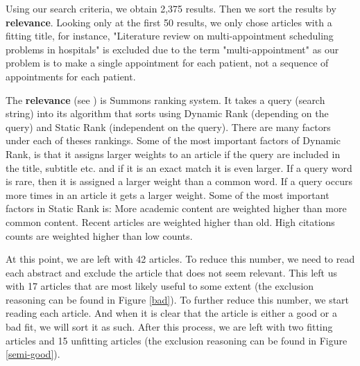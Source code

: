 \documentclass[a4paper,12pt]{article}
\begin{document}
\bigbreak

Using our search criteria, we obtain 2,375 results. Then we sort the results by \textbf{relevance}.
Looking only at the first 50 results, we only chose articles with a fitting title, for instance, "Literature review on multi-appointment scheduling problems in hospitals" is excluded due to the term "multi-appointment" as our problem is to make a single appointment for each patient, not a sequence of appointments for each patient.
\bigbreak

The \textbf{relevance} (see \cite{relevance}) is Summons ranking system. It takes a query (search string) into its algorithm that sorts using Dynamic Rank (depending on the query) and Static Rank (independent on the query). There are many factors under each of theses rankings. Some of the most important factors of Dynamic Rank, is that it assigns larger weights to an article if the query are included in the title, subtitle etc. and if it is an exact match it is even larger. If a query word is rare, then it is assigned a larger weight than a common word. If a query occurs more times in an article it gets a larger weight. Some of the most important  factors in Static Rank is: More academic content are weighted higher than more common content. Recent articles are weighted higher than old. High citations counts are weighted higher than low counts.






\bigbreak

At this point, we are left with 42 articles. To reduce this number, we need to read each abstract and exclude the article that does not seem relevant. This left us with 17 articles that are most likely useful to some extent (the exclusion reasoning can be found in Figure \ref{bad}). To further reduce this number, we start reading each article. And when it is clear that the article is either a good or a bad fit, we will sort it as such. After this process, we are left with two fitting articles and 15 unfitting articles (the exclusion reasoning can be found in Figure \ref{semi-good}).
\end{document}
